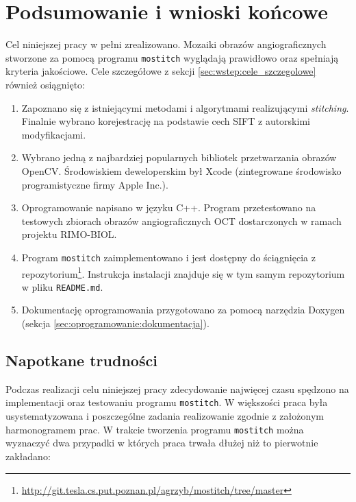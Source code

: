 \chapter{Podsumowanie i wnioski końcowe}
\label{sec:podsumowanie_i_wnioski}

Cel niniejszej pracy w pełni zrealizowano. Mozaiki obrazów angiograficznych stworzone za pomocą programu \texttt{mostitch} wyglądają prawidłowo oraz spełniają kryteria jakościowe. Cele szczegółowe z sekcji \ref{sec:wstep:cele_szczegolowe} również osiągnięto:

\begin{enumerate}
\item Zapoznano się z istniejącymi metodami i algorytmami realizującymi \textit{stitching}. Finalnie wybrano korejestrację na podstawie cech SIFT z autorskimi modyfikacjami.
\item Wybrano jedną z najbardziej popularnych bibliotek przetwarzania obrazów OpenCV. Środowiskiem deweloperskim był Xcode (zintegrowane środowisko programistyczne firmy Apple Inc.).
\item Oprogramowanie napisano w języku C++. Program przetestowano na testowych zbiorach obrazów angiograficznych OCT dostarczonych w ramach projektu RIMO-BIOL.
\item Program \texttt{mostitch} zaimplementowano i jest dostępny do ściągnięcia z repozytorium\footnote{\url{http://git.tesla.cs.put.poznan.pl/agrzyb/mostitch/tree/master}}. Instrukcja instalacji znajduje się w tym samym repozytorium w pliku \texttt{README.md}.
\item Dokumentację oprogramowania przygotowano za pomocą narzędzia Doxygen (sekcja \ref{sec:oprogramowanie:dokumentacja}).
\end{enumerate}

\section{Napotkane trudności}
\label{sec:podsumowanie_i_wnioski:napotkane_trudnosci}

Podczas realizacji celu niniejszej pracy zdecydowanie najwięcej czasu spędzono na implementacji oraz testowaniu programu \texttt{mostitch}. W większości praca była usystematyzowana i poszczególne zadania realizowanie zgodnie z założonym harmonogramem prac. W trakcie tworzenia programu \texttt{mostitch} można wyznaczyć dwa przypadki w których praca trwała dłużej niż to pierwotnie zakładano:


